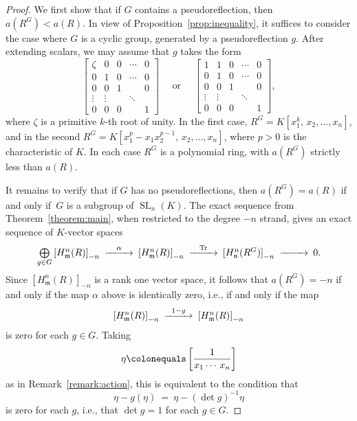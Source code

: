 \documentclass[12pt]{amsart}
\theoremstyle{definition}
\numberwithin{equation}{theorem}
\def\SL{\operatorname{SL}}
\def\Tr{\operatorname{Tr}}
\def\frakm{\mathfrak{m}}
\def\frakn{\mathfrak{n}}
\begin{document}
\begin{proof}
We first show that if $G$ contains a pseudoreflection, then $a(R^G)<a(R)$. In view of Proposition~\ref{prop:inequality}, it suffices to consider the case where $G$ is a cyclic group, generated by a pseudoreflection $g$. After extending scalars, we may assume that $g$ takes the form
\[
\left[
\begin{array}{c|cccc}
\zeta & 0 & 0 & \cdots & 0 \\
\hline
0 & 1 & 0 & \cdots & 0 \\
0 & 0 & 1 & & 0 \\
\vdots & \vdots & & \ddots & \\
0 & 0 & 0 & & 1
\end{array}
\right]
\quad\text{ or }\quad
\left[
\begin{array}{cc|ccc}
1 & 1 & 0 & \cdots & 0 \\
0 & 1 & 0 & \cdots & 0 \\
\hline
0 & 0 & 1 & & 0 \\
\vdots & \vdots & & \ddots & \\
0 & 0 & 0 & & 1
\end{array}
\right],
\]
where $\zeta$ is a primitive $k$-th root of unity. In the first case, $R^G=K[x_1^k,\, x_2,\dots,x_n]$, and in the second $R^G=K[x_1^p-x_1x_2^{p-1},\, x_2,\dots,x_n]$, where $p>0$ is the characteristic of $K$. In each case $R^G$ is a polynomial ring, with $a(R^G)$ strictly less than $a(R)$.

It remains to verify that if $G$ has no pseudoreflections, then $a(R^G)=a(R)$ if and only if~$G$ is a subgroup of $\SL_n(K)$. The exact sequence from Theorem~\ref{theorem:main}, when restricted to the degree $-n$ strand, gives an exact sequence of $K$-vector spaces
\[
\CD
\bigoplus\limits_{g \in G} {[H^n_\frakm(R)]}_{-n} @>{\alpha}>> {[H^n_\frakm(R)]}_{-n} @>\Tr>> {[H^n_\frakn(R^G)]}_{-n} @>>> 0.
\endCD
\]
Since ${[H^n_\frakm(R)]}_{-n}$ is a rank one vector space, it follows that $a(R^G)=-n$ if and only if the map $\alpha$ above is identically zero, i.e., if and only if the map
\[
\CD
{[H^n_\frakm(R)]}_{-n} @>{1-g}>> {[H^n_\frakm(R)]}_{-n}
\endCD
\]
is zero for each $g\in G$. Taking
\[
\eta\colonequals\left[\frac{1}{x_1\cdots\,x_n}\right]
\]
as in Remark~\ref{remark:action}, this is equivalent to the condition that
\[
\eta-g(\eta)\ =\ \eta-(\det g)^{-1}\eta
\]
is zero for each $g$, i.e., that $\det g=1$ for each $g\in G$.
\end{proof}


\begin{comment}
\end{comment}

\vfill
\end{document}

